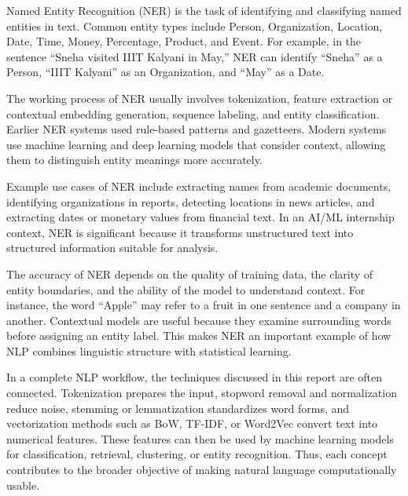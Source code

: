 \documentclass[10pt]{article}
\begin{document}
Named Entity Recognition (NER) is the task of identifying and classifying named entities in text. Common entity types include Person, Organization, Location, Date, Time, Money, Percentage, Product, and Event. For example, in the sentence ``Sneha visited IIIT Kalyani in May,'' NER can identify ``Sneha'' as a Person, ``IIIT Kalyani'' as an Organization, and ``May'' as a Date.

The working process of NER usually involves tokenization, feature extraction or contextual embedding generation, sequence labeling, and entity classification. Earlier NER systems used rule-based patterns and gazetteers. Modern systems use machine learning and deep learning models that consider context, allowing them to distinguish entity meanings more accurately.

Example use cases of NER include extracting names from academic documents, identifying organizations in reports, detecting locations in news articles, and extracting dates or monetary values from financial text. In an AI/ML internship context, NER is significant because it transforms unstructured text into structured information suitable for analysis.

The accuracy of NER depends on the quality of training data, the clarity of entity boundaries, and the ability of the model to understand context. For instance, the word ``Apple'' may refer to a fruit in one sentence and a company in another. Contextual models are useful because they examine surrounding words before assigning an entity label. This makes NER an important example of how NLP combines linguistic structure with statistical learning.

In a complete NLP workflow, the techniques discussed in this report are often connected. Tokenization prepares the input, stopword removal and normalization reduce noise, stemming or lemmatization standardizes word forms, and vectorization methods such as BoW, TF-IDF, or Word2Vec convert text into numerical features. These features can then be used by machine learning models for classification, retrieval, clustering, or entity recognition. Thus, each concept contributes to the broader objective of making natural language computationally usable.
\end{document}
